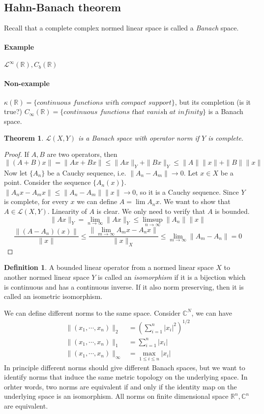 \documentclass[12pt]{article}
\theoremstyle{plain}
\newtheorem{theorem}[equation]{Theorem}
\theoremstyle{definition}
\newtheorem{definition}[equation]{Definition}
\theoremstyle{named}
\newcommand{\sL}{\mathcal{L}}
\newcommand{\shL}{\mathscr{L}}
\newcommand{\<}{\langle}
\renewcommand{\>}{\rangle}
\newcommand{\IR}{\mathbb{R}}
\newcommand{\IC}{\mathbb{C}}
\begin{document}
\subsection{Hahn-Banach theorem}
Recall that a complete complex normed linear space is called a \textit{Banach} space. 

\paragraph{Example} $\sL^\infty(\IR), C_b(\IR)$
\paragraph{Non-example} $\kappa(\IR) = \{\textit{continuous functions with compact support} \}$, but its completion (is it true?) $C_\infty(\IR) = \{ \textit{continuous functions that vanish at infinity} \}$ is a Banach space. 

\begin{theorem}
$\shL(X, Y)$ is a Banach space with operator norm if $Y$ is complete. 
\end{theorem}
\begin{proof}
If $A, B$ are two operators, then 
$$\| (A + B) x \| = \| A x + B x \| \le \| A x \|_Y + \| B x \|_Y \le \| A \| \|x\| + \| B \| \|x \| $$
Now let $\{ A_n \}$ be a Cauchy sequence, i.e. $\| A_n - A_m \| \to 0$. Let $x \in X$ be a point. Consider the sequence $\{ A_n(x) \}$. $\| A_n x - A_m x \| \le \| A_n - A_m \| \| x \| \to 0$, so it is a Cauchy sequence. Since $Y$ is complete, for every $x$ we can define $A = \lim A_n x$. We want to show that $A \in \shL(X, Y)$. Linearity of $A$ is clear. We only need to verify that $A$ is bounded. 
$$ \| A x \|_Y = \lim_{n \to \infty} \| A x \|_Y \le \limsup_{n \to \infty} \| A_n \| \| x \| $$
$$ \frac{\|(A - A_n)(x)\|}{\| x \|} \le \frac{\| \lim_{m \to \infty} A_m x - A_n x \|}{\| x \|_X} \le \lim_{m \to \infty} \| A_m - A_n \| = 0 $$
\end{proof}
\begin{definition}
A bounded linear operator from a normed linear space $X$ to another normed linear space $Y$ is called an \textit{isomorphism} if it is a bijection which is continuous and has a continuous inverse. If it also norm preserving, then it is called an isometric isomorphism. 
\end{definition}
We can define different norms to the same space. Consider $\IC^N$, we can have 
\begin{align*}
\| (x_1, \cdots, x_n ) \|_2 &= (\sum_{i = 1}^n |x_i|^2)^{1/2} 
\\ \| (x_1, \cdots, x_n ) \|_1 &= \sum_{i = 1}^n |x_i| \\ \| (x_1, \cdots, x_n) \|_\infty &= \max_{1 \le i \le n} |x_i| 
\end{align*} 
In principle different norms should give different Banach spaces, but we want to identify norms that induce the same metric topology on the underlying space. In orhter words, two norms are equivalent if and only if the identity map on the underlying space is an isomorphism. All norms on finite dimensional space $\IR^n, \IC^n$ are equivalent. 
\end{document}
